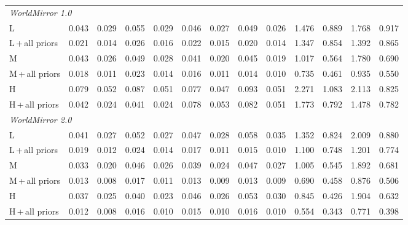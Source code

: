 \documentclass{article} %
\begin{document}
\begin{table}[t]
{\begin{tabular}{l @{\hskip 12pt} cccc @{\hskip 12pt} cccc @{\hskip 12pt} cccc}
        \midrule[0.08em]
        \multicolumn{13}{l}{\textit{WorldMirror 1.0}} \\[2pt]
        \quad L
            & 0.043 & 0.029 & 0.055 & 0.029
            & 0.046 & 0.027 & 0.049 & 0.026
            & 1.476 & 0.889 & 1.768 & 0.917 \\
        \quad L\,+\,all priors
            & 0.021 & 0.014 & 0.026 & 0.016
            & 0.022 & 0.015 & 0.020 & 0.014
            & 1.347 & 0.854 & 1.392 & 0.865 \\[3pt]
        \quad M
            & 0.043 & 0.026 & 0.049 & 0.028
            & 0.041 & 0.020 & 0.045 & 0.019
            & 1.017 & 0.564 & 1.780 & 0.690 \\
        \quad M\,+\,all priors
            & 0.018 & 0.011 & 0.023 & 0.014
            & 0.016 & 0.011 & 0.014 & 0.010
            & 0.735 & 0.461 & 0.935 & 0.550 \\[3pt]
        \quad H
            & 0.079 & 0.052 & 0.087 & 0.051
            & 0.077 & 0.047 & 0.093 & 0.051
            & 2.271 & 1.083 & 2.113 & 0.825 \\
        \quad H\,+\,all priors
            & 0.042 & 0.024 & 0.041 & 0.024
            & 0.078 & 0.053 & 0.082 & 0.051
            & 1.773 & 0.792 & 1.478 & 0.782 \\

        \midrule[0.04em]
        \multicolumn{13}{l}{\textit{WorldMirror 2.0}} \\[2pt]
        \quad L
            & 0.041 & 0.027 & 0.052 & 0.027
            & 0.047 & 0.028 & 0.058 & 0.035
            & 1.352 & 0.824 & 2.009 & 0.880 \\
        \quad L\,+\,all priors
            & 0.019 & 0.012 & 0.024 & 0.014
            & 0.017 & 0.011 & 0.015 & 0.010
            & 1.100 & 0.748 & 1.201 & 0.774 \\[3pt]
        \quad M
            & 0.033 & 0.020 & 0.046 & 0.026
            & 0.039 & 0.024 & 0.047 & 0.027
            & 1.005 & 0.545 & 1.892 & 0.681 \\
        \quad M\,+\,all priors
            & 0.013 & \colorbox{catgray}{0.008} & 0.017 & 0.011
            & \colorbox{catgray}{0.013} & \colorbox{catgray}{0.009} & \colorbox{catgray}{0.013} & \colorbox{catgray}{0.009}
            & 0.690 & 0.458 & 0.876 & 0.506 \\[3pt]
        \quad H
            & 0.037 & 0.025 & 0.040 & 0.023
            & 0.046 & 0.026 & 0.053 & 0.030
            & 0.845 & 0.426 & 1.904 & 0.632 \\
        \quad H\,+\,all priors
            & \colorbox{catgray}{0.012} & {0.008} & \colorbox{catgray}{0.016} & \colorbox{catgray}{0.010}
            & 0.015 & 0.010 & 0.016 & 0.010
            & \colorbox{catgray}{0.554} & \colorbox{catgray}{0.343} & \colorbox{catgray}{0.771} & \colorbox{catgray}{0.398} \\
        \bottomrule[0.12em]
    \end{tabular}
    }
    \label{tab:wm_pointmap}
\end{table}
\end{document}
